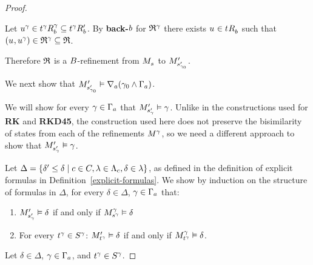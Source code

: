 \begin{proof}
\begin{description}
\begin{description}
                Let $\kStateU[\gamma] \in \kSuccessorsB[\gamma]{\kStateT[\gamma]} \subseteq \kSuccessorsPB{\kStateT[\gamma]}$.
                By {\bf back-$\agentB$} for $\refinement^\gamma$ there exists $\kStateU \in \kSuccessorsB{\kStateT}$ such that $(\kStateU, \kStateU[\gamma]) \in \refinement^\gamma \subseteq \refinement$.
        \end{description}
\end{description}

Therefore $\refinement$ is a $\agentsB$-refinement from $\kPModel{\kStateS}$ to $\kPModelP{\kStateSP_{\gamma_0}}$.

We next show that $\kPModelP{\kStateSP_{\gamma_0}} \entails \coversA (\gamma_0 \land \Gamma_\agentA)$.

We will show for every $\gamma \in \Gamma_\agentA$ that $\kPModelP{\kStateSP_\gamma} \entails \gamma$.
Unlike in the constructions used for {\bf RK} and {\bf RKD45}, the construction used here does not preserve the bisimilarity of states from each of the refinements $\kModel[\gamma]$, so we need a different approach to show that $\kPModelP{\kStateSP_\gamma} \entails \gamma$.

Let $\Delta = \{\delta' \leq \delta \mid \agentC \in \agentsC, \lambda \in \Lambda_\agentC, \delta \in \lambda\}$, as defined in the definition of explicit formulas in Definition~\ref{explicit-formulas}.
We show by induction on the structure of formulas in $\Delta$, for every $\delta \in \Delta$, $\gamma \in \Gamma_\agentA$ that:
\begin{enumerate}
    \item $\kPModelP{\kStateSP_\gamma} \entails \delta$ if and only if $\kPModel[\gamma]{\kStateS[\gamma]} \entails \delta$
    \item For every $\kStateT[\gamma] \in \kStates[\gamma]$: $\kPModelP{\kStateT[\gamma]} \entails \delta$ if and only if $\kPModel[\gamma]{\kStateT[\gamma]} \entails \delta$.
\end{enumerate}

Let $\delta \in \Delta$, $\gamma \in \Gamma_\agentA$, and $\kStateT[\gamma] \in \kStates[\gamma]$.


\end{proof}

